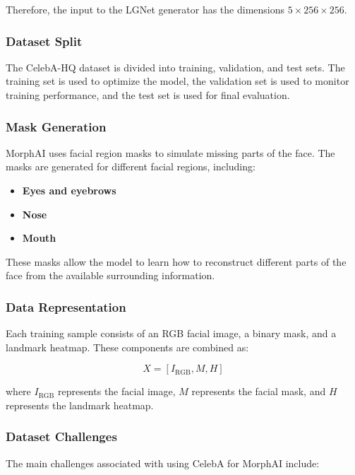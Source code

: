 \noindent Therefore, the input to the LGNet generator has the dimensions
$5 \times 256 \times 256$.

\subsubsection{Dataset Split}

The CelebA-HQ dataset is divided into training, validation, and test sets.
The training set is used to optimize the model, the validation set is used
to monitor training performance, and the test set is used for final
evaluation.

\subsubsection{Mask Generation}

MorphAI uses facial region masks to simulate missing parts of the face.
The masks are generated for different facial regions, including:

\begin{itemize}
    \item \textbf{Eyes and eyebrows}
    \item \textbf{Nose}
    \item \textbf{Mouth}
\end{itemize}

\noindent These masks allow the model to learn how to reconstruct different
parts of the face from the available surrounding information.

\subsubsection{Data Representation}

Each training sample consists of an RGB facial image, a binary mask, and a
landmark heatmap. These components are combined as:

\begin{equation}
X = [I_{\text{RGB}}, M, H]
\end{equation}

\noindent where $I_{\text{RGB}}$ represents the facial image, $M$ represents
the facial mask, and $H$ represents the landmark heatmap.


\subsubsection{Dataset Challenges}

The main challenges associated with using CelebA for MorphAI include:

